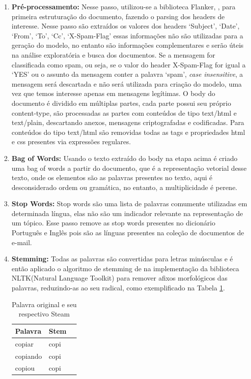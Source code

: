 \documentclass[12pt,a4paper]{article}
\begin{document}
\begin{enumerate}
\item \textbf{Pré-processamento:} Nesse passo, utilizou-se a biblioteca Flanker, , para primeira estruturação do documento, fazendo o parsing dos headers de interesse. Nesse passo são extraídos os valores dos headers ‘Subject’, ‘Date’, ‘From’, ‘To’, ‘Cc’, ‘X-Spam-Flag’ essas informações não são utilizadas para a geração do modelo,
 no entanto são informações complementares e serão úteis na análise exploratória e busca dos documentos. Se a mensagem for classificada como spam, ou seja, 
 se o valor do header X-Spam-Flag for igual a ‘YES’ ou o assunto da mensagem conter a palavra ‘spam’, \textit{case insensitive}, a mensagem será descartada e não será utilizada para criação do modelo,
 uma vez que temos interesse apenas em mensagens legítimas. O body do documento é dividido em múltiplas partes, cada parte possui seu próprio content-type,
 são processadas as partes com conteúdos de tipo text/html e text/plain, descartando anexos, mensagens criptografadas e codificadas. 
 Para conteúdos do tipo text/html são removidas todas as tags e propriedades html e css presentes via expressões regulares.
\item \textbf{Bag of Words:} Usando o texto extraído do body na etapa acima é criado uma bag of words a partir do documento, que é a representação vetorial desse texto,
 onde os elementos são as palavras presentes no texto, aqui é desconsiderado ordem ou gramática, no entanto, a multiplicidade é perene.
\item \textbf{Stop Words:} Stop words são uma lista de palavras comumente utilizadas em determinada língua, elas não são um indicador relevante na representação de um tópico.
 Esse passo remove as stop words presentes no dicionário Português e Inglês pois são as línguas presentes na coleção de documentos de e-mail.
\item \textbf{Stemming:} Todas as palavras são convertidas para letras minúsculas e é então aplicado o algoritmo de stemming de 
 na implementação da biblioteca NLTK(Natural Language Toolkit)  para remover afixos morfológicos das palavras, reduzindo-as ao seu radical, como exemplificado na Tabela \ref{tab-stem}.


\begin{table}[h]
  \centering
  \begin{tabular}{l l l}
  Palavra		&Stem &\\
  \hline
  copiar		&copi &\\
  copiando		&copi &\\
  copiou		&copi &\\
  \hline
  \end{tabular}
  \caption{Palavra original e seu respectivo Steam}
  \label{tab-stem}
\end{table}


\end{enumerate}
\end{document}
